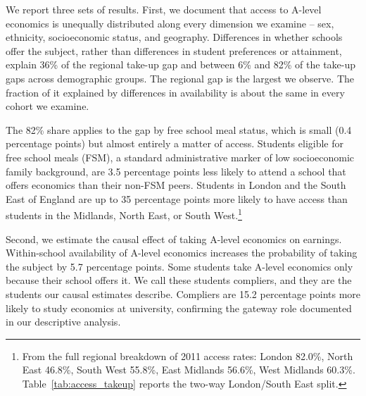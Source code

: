 

We report three sets of results. First, we document that access to A-level economics is unequally distributed along every dimension we examine -- sex, ethnicity, socioeconomic status, and geography. Differences in whether schools offer the subject, rather than differences in student preferences or attainment, explain 36\% of the regional take-up gap and between 6\% and 82\% of the take-up gaps across demographic groups. The regional gap is the largest we observe. The fraction of it explained by differences in availability is about the same in every cohort we examine.

The 82\% share applies to the gap by free school meal status, which is small (0.4 percentage points) but almost entirely a matter of access. Students eligible for free school meals (FSM), a standard administrative marker of low socioeconomic family background, are 3.5 percentage points less likely to attend a school that offers economics than their non-FSM peers. Students in London and the South East of England are up to 35 percentage points more likely to have access than students in the Midlands, North East, or South West.\footnote{From the full regional breakdown of 2011 access rates: London 82.0\%, North East 46.8\%, South West 55.8\%, East Midlands 56.6\%, West Midlands 60.3\%. Table~\ref{tab:access_takeup} reports the two-way London/South East split.} %

Second, we estimate the causal effect of taking A-level economics on earnings. Within-school availability of A-level economics increases the probability of taking the subject by 5.7 percentage points. Some students take A-level economics only because their school offers it. We call these students compliers, and they are the students our causal estimates describe. Compliers are 15.2 percentage points more likely to study economics at university, confirming the gateway role documented in our descriptive analysis.

